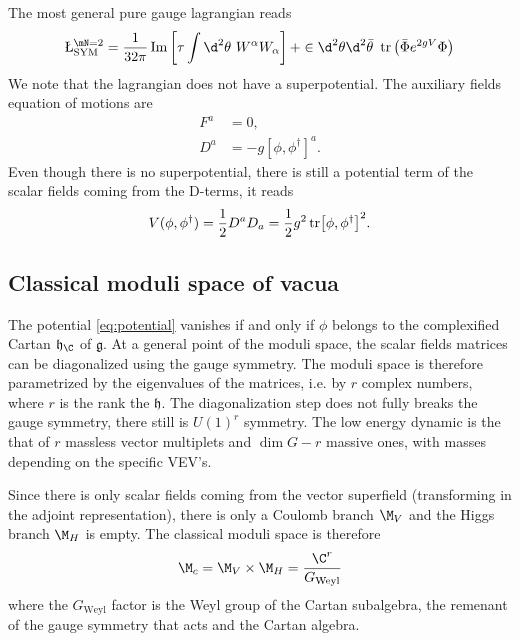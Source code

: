 \documentclass{worksheetclass}
\begin{document}
        The most general pure gauge lagrangian reads
        \begin{eqnarray}
            \L^{\mN=2}_{\text{SYM}} = \frac{1}{32\pi}\Im\left[\tau\int\d^2\theta~W^\alpha W_\alpha\right] + \in\d^2\theta\d^2\bar{\theta}~\tr\left(\bar{\Phi}e^{2gV}\Phi\right)
        \end{eqnarray}
        We note that the lagrangian does not have a superpotential. The auxiliary fields equation of motions are
        \begin{align}
            F^a &= 0,\\
            D^a &= -g[\phi,\phi^\dagger]^a.
        \end{align}
        Even though there is no superpotential, there is still a potential term of the scalar fields coming from the D-terms, it reads
        \begin{eqnarray}
            V(\phi,\phi^\dagger)=\frac{1}{2}D^aD_a=\frac{1}{2}g^2\tr[\phi,\phi^\dagger]^2.\label{eq:potential}
        \end{eqnarray}

    \subsection{Classical moduli space of vacua}

        The potential \eqref{eq:potential} vanishes if and only if $\phi$ belongs to the complexified Cartan $\mathfrak{h}_\C$ of $\mathfrak{g}$. At a general point of the moduli space, the scalar fields matrices can be diagonalized using the gauge symmetry. The moduli space is therefore parametrized by the eigenvalues of the matrices, i.e. by $r$ complex numbers, where $r$ is the rank the $\mathfrak{h}$. The diagonalization step does not fully breaks the gauge symmetry, there still is $U(1)^r$ symmetry. The low energy dynamic is the that of $r$ massless vector multiplets and $\dim G-r$ massive ones, with masses depending on the specific VEV's.

        Since there is only scalar fields coming from the vector superfield (transforming in the adjoint representation), there is only a Coulomb branch $\M_V$ and the Higgs branch $\M_H$ is empty. The classical moduli space is therefore
        \begin{eqnarray}
            \M_c = \M_V\times\M_H=\frac{\C^r}{G_{\text{Weyl}}}
        \end{eqnarray}
        where the $G_{\text{Weyl}}$ factor is the Weyl group of the Cartan subalgebra, the remenant of the gauge symmetry that acts and the Cartan algebra.
\end{document}

